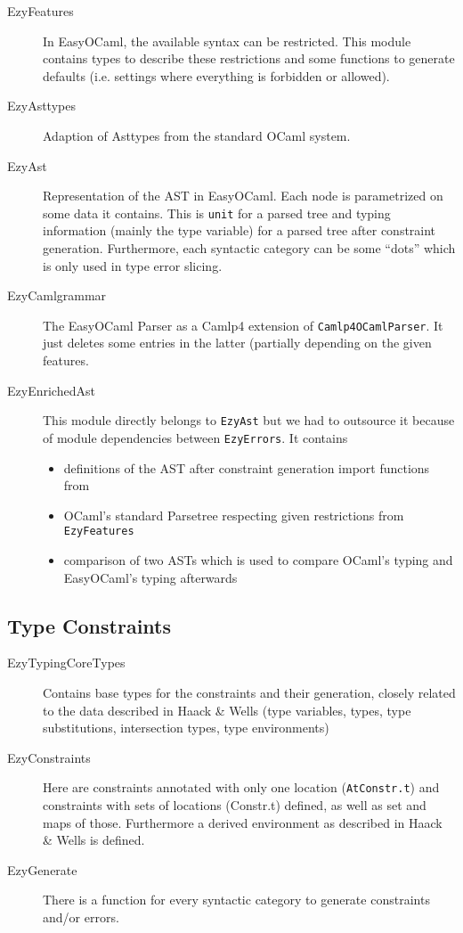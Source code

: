 \begin{description}
    \item[EzyFeatures] In EasyOCaml, the available syntax can be 
        restricted.  This module contains types to describe these 
        restrictions and some functions to generate defaults (i.e. 
        settings where everything is forbidden or allowed).
    \item[EzyAsttypes] Adaption of Asttypes from the standard OCaml 
        system.
    \item[EzyAst] Representation of the AST in EasyOCaml.  Each node 
        is parametrized on some data it contains.  This is \texttt{unit} 
        for a parsed tree and typing information (mainly the type 
        variable) for a parsed tree after constraint generation. 
        Furthermore, each syntactic category can be some ``dots'' which 
        is only used in type error slicing.
    \item[EzyCamlgrammar] The EasyOCaml Parser as a Camlp4 extension 
        of \texttt{Camlp4OCamlParser}.  It just deletes some entries in 
        the latter (partially depending on the given features.
    \item[EzyEnrichedAst] This module directly belongs to 
        \texttt{EzyAst} but we had to outsource it because of module 
        dependencies between \texttt{EzyErrors}.  It contains
        \begin{itemize}
            \item definitions of the AST after constraint generation 
                import functions from
            \item OCaml's standard Parsetree respecting given 
                restrictions from \texttt{EzyFeatures}
            \item comparison of two ASTs which is used to compare 
                OCaml's typing and EasyOCaml's typing afterwards
        \end{itemize}
\end{description}


\subsection{Type Constraints}
\label{hd005006}
\begin{description}
    \item[EzyTypingCoreTypes] Contains base types for the 
        constraints and their generation, closely related to the data 
        described in Haack \& Wells (type variables, types, type 
        substitutions, intersection types, type environments)
    \item[EzyConstraints] Here are constraints annotated with only 
        one location (\texttt{AtConstr.t}) and constraints with sets of 
        locations (Constr.t) defined, as well as set and maps of those.  
        Furthermore a derived environment as described in Haack \& Wells 
        is defined.
    \item[EzyGenerate] There is a function for every syntactic 
        category to generate constraints and/or errors.
\end{description}

